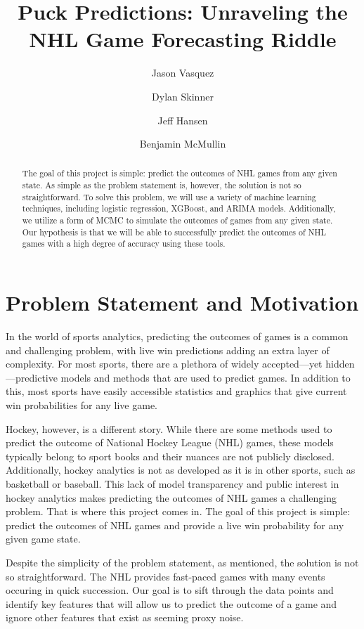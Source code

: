 \documentclass[11pt]{article}
\title{Puck Predictions: Unraveling the NHL Game Forecasting Riddle}
\author{Jason Vasquez \and Dylan Skinner \and Jeff Hansen \and Benjamin McMullin}
\begin{document}
\maketitle

\begin{abstract}
    The goal of this project is simple: predict the outcomes of NHL games from any given state.
    As simple as the problem statement is, however, the solution is not so straightforward.
    To solve this problem, we will use a variety of machine learning techniques, including logistic regression,
    XGBoost, and ARIMA models. Additionally, we utilize a form of MCMC to simulate the outcomes of games from any given
    state. Our hypothesis is that we will be able to successfully predict the outcomes of NHL games with a high degree of accuracy
    using these tools.
\end{abstract}

\section{Problem Statement and Motivation}
In the world of sports analytics, predicting the outcomes of games is a common and challenging problem, with live win predictions adding
an extra layer of complexity. For most sports, there are a plethora of widely accepted—yet hidden—predictive models and methods that are used to
predict games. In addition to this, most sports have easily accessible statistics and graphics that give current win probabilities for any live game.

Hockey, however, is a different story. While there are some methods used to predict the outcome of National Hockey League (NHL) games, these models
typically belong to sport books and their nuances are not publicly disclosed. Additionally, hockey analytics is not as
developed as it is in other sports, such as basketball or baseball. This lack of model transparency and public interest in hockey analytics
makes predicting the outcomes of NHL games a challenging problem. That is where this project comes in. The goal of this project is simple: predict
the outcomes of NHL games and provide a live win probability for any given game state.

Despite the simplicity of the problem statement, as mentioned, the solution is not so straightforward. The NHL provides fast-paced games with many events
occuring in quick succession. Our goal is to sift through the data points and identify key features that will allow us to predict the outcome of a game and
ignore other features that exist as seeming proxy noise.
\end{document}
